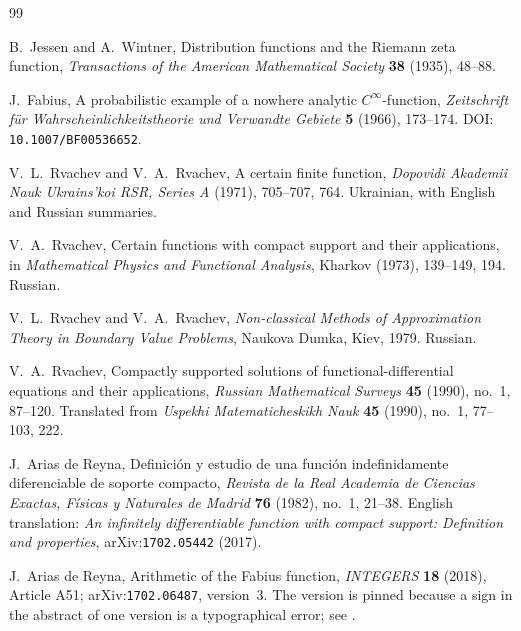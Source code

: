 \documentclass[11pt,oneside]{article}
\theoremstyle{definition}
\theoremstyle{remark}
\begin{document}
\begin{thebibliography}{99}

B.~Jessen and A.~Wintner,
\newblock Distribution functions and the Riemann zeta function,
\newblock \emph{Transactions of the American Mathematical Society}
  \textbf{38} (1935), 48--88.

J.~Fabius,
\newblock A probabilistic example of a nowhere analytic $C^\infty$-function,
\newblock \emph{Zeitschrift für Wahrscheinlichkeitstheorie und Verwandte Gebiete}
  \textbf{5} (1966), 173--174.
\newblock DOI: \nolinkurl{10.1007/BF00536652}.

V.~L.~Rvachev and V.~A.~Rvachev,
\newblock A certain finite function,
\newblock \emph{Dopovidi Akademii Nauk Ukrains'koi RSR, Series A}
  (1971), 705--707, 764.  Ukrainian, with English and Russian summaries.

V.~A.~Rvachev,
\newblock Certain functions with compact support and their applications,
\newblock in \emph{Mathematical Physics and Functional Analysis}, Kharkov
  (1973), 139--149, 194.  Russian.

V.~L.~Rvachev and V.~A.~Rvachev,
\newblock \emph{Non-classical Methods of Approximation Theory in Boundary Value
  Problems},
\newblock Naukova Dumka, Kiev, 1979.  Russian.

V.~A.~Rvachev,
\newblock Compactly supported solutions of functional-differential equations
  and their applications,
\newblock \emph{Russian Mathematical Surveys} \textbf{45} (1990), no.~1,
  87--120.
\newblock Translated from \emph{Uspekhi Matematicheskikh Nauk} \textbf{45}
  (1990), no.~1, 77--103, 222.

J.~Arias de Reyna,
\newblock Definición y estudio de una función indefinidamente diferenciable de
  soporte compacto,
\newblock \emph{Revista de la Real Academia de Ciencias Exactas, Físicas y
  Naturales de Madrid} \textbf{76} (1982), no.~1, 21--38.
\newblock English translation:
  \emph{An infinitely differentiable function with compact support: Definition and
  properties}, arXiv:\nolinkurl{1702.05442} (2017).

J.~Arias de Reyna,
\newblock Arithmetic of the Fabius function,
\newblock \emph{INTEGERS} \textbf{18} (2018), Article A51;
  arXiv:\nolinkurl{1702.06487}, version~3.
\newblock The version is pinned because a sign in the abstract of one version
  is a typographical error; see .


\end{thebibliography}
\end{document}

